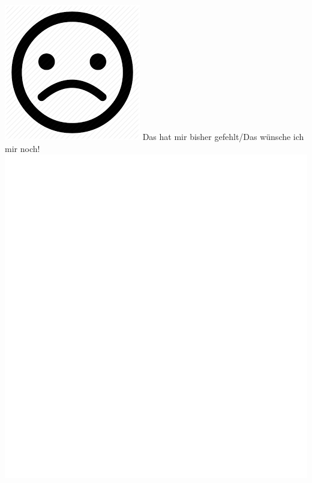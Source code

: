 \documentclass[oneside,openany,headings=optiontotoc,11pt,numbers=noenddot]{scrreprt}
\begin{document}
	\begin{framed}
		\noindent
		\includegraphics[scale=0.1]{ssmi.png} \tiny{\color{codegray}Das hat mir bisher gefehlt/Das wünsche ich mir noch!}\\
		\includegraphics[scale=0.15]{empty.jpg}
	\end{framed}
	\par\bigskip\noindent
\end{document}
